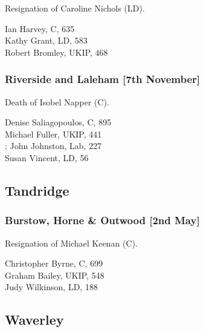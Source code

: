 \documentclass[a4paper,openany,10pt]{book}
\begin{document}

Resignation of Caroline Nichols (LD).



Ian Harvey, C, 635\\
Kathy Grant, LD, 583\\
Robert Bromley, UKIP, 468\\


\subsubsection*{Riverside and Laleham \hspace*{\fill}\nolinebreak[1]%
\enspace\hspace*{\fill}
[7th November]}


Death of Isobel Napper (C).



Denise Saliagopoulos, C, 895\\
Michael Fuller, UKIP, 441\\;
John Johnston, Lab, 227\\
Susan Vincent, LD, 56\\


\subsection*{Tandridge}

\subsubsection*{Burstow, Horne \& Outwood \hspace*{\fill}\nolinebreak[1]%
\enspace\hspace*{\fill}
[2nd May]}


Resignation of Michael Keenan (C).



Christopher Byrne, C, 699\\
Graham Bailey, UKIP, 548\\
Judy Wilkinson, LD, 188\\


\subsection*{Waverley}
\end{document}

